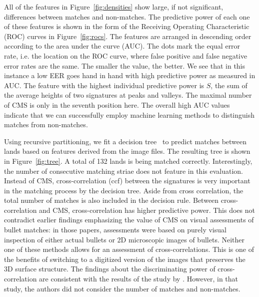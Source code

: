 \documentclass[aoas, preprint]{imsart}\usepackage[]{graphicx}\usepackage[]{color}
\begin{document}
All of the features in Figure~\ref{fig:densities} show large, if not significant, differences between matches and non-matches. The predictive power of each one of these features is shown in the form of the Receiving Operating Characteristic (ROC) curves in Figure~\ref{fig:rocs}. The features are arranged in descending order according to the area under the curve (AUC).
The dots mark the equal error rate, i.e. the location on the ROC curve, where false positive and false negative error rates are the same. The smaller the value, the better. We see that in this instance a low EER goes hand in hand with high predictive power as measured in AUC.
The feature with the highest individual predictive power is $S$, the sum of the average heights of two signatures at peaks and valleys. The maximal number of CMS is only in the seventh position here. The overall high AUC values indicate that we can successfully employ machine learning methods to distinguish matches from non-matches.

Using recursive partitioning, we fit a decision tree~\citep{breiman:1984, rpart, rpart.plot} to predict matches between lands based on features derived from the image files. The resulting tree is shown in Figure~\ref{fig:tree}. A total of 132 lands is being matched correctly. Interestingly, the number of consecutive matching striae does not feature in this evaluation. 
Instead of CMS, cross-correlation (ccf) between the signatures is very important in the matching process  by the decision tree. Aside from  cross correlation, the total number of matches is also included in the decision rule. 
Between cross-correlation and CMS, cross-correlation has higher  predictive power. This  does not  contradict earlier findings emphasizing the value of CMS on visual assessments of bullet matches: in those papers, assessments were based on purely visual inspection of either actual bullets or 2D microscopic images of bullets.
Neither one of these methods allows for an assessment of cross-correlations. This is one of the benefits of switching to a digitized version of the images that preserves the 3D surface structure. The findings about the discriminating power of cross-correlation are consistent with the results of the study by \citet{ma:2004}. However, in that study, the authors did not consider the number of matches and non-matches.
\end{document}
